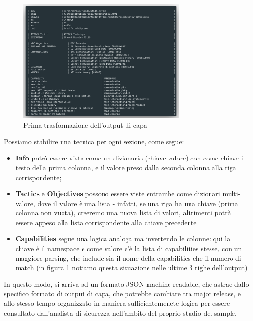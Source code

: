 \begin{figure}
    \centering
    \includegraphics[width=0.75\textwidth]{assets/capa_out_first_parse.png}
    \caption{Prima trasformazione dell'output di capa}
    \label{fig:capa_out_first_parse}
\end{figure}

Possiamo stabilire una tecnica per ogni sezione, come segue:
\begin{itemize}
    \item \textbf{Info} potrà essere vista come un dizionario (chiave-valore) con come chiave il testo della prima colonna, e il valore preso dalla seconda colonna alla riga corrispondente;
    \item \textbf{Tactics} e \textbf{Objectives} possono essere viste entrambe come dizionari multi-valore, dove il valore è una lista -
    infatti, se una riga ha una chiave (prima colonna non vuota), creeremo una nuova lista di valori, altrimenti potrà essere appeso alla lista corrispondente alla chiave precedente
    \item \textbf{Capabilities} segue una logica analoga ma invertendo le colonne: qui la chiave è il namespace e come valore c'è la lista di capabilities stesse, con un maggiore parsing, che include sia il nome della capabilities che il numero di match (in figura \ref{fig:capa_out_first_parse} notiamo questa situazione nelle ultime 3 righe dell'output) 
\end{itemize}

In questo modo, si arriva ad un formato JSON machine-readable, che astrae dallo specifico formato di output di capa, che potrebbe cambiare tra major release, e allo stesso tempo organizzato in maniera sufficientemenete logica per essere consultato dall'analista di sicurezza nell'ambito del proprio studio del sample.

